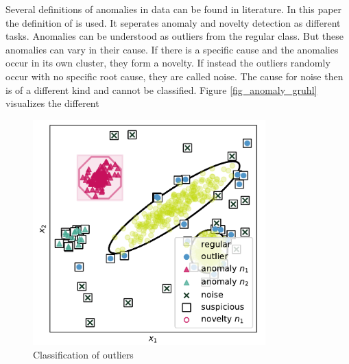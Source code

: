 Several definitions of anomalies in data can be found in literature. In this paper the definition of \cite[p. 54]{gruhl_novelty_2022} is used. It seperates anomaly and novelty detection as different tasks. Anomalies can be understood as outliers from the regular class. But these anomalies can vary in their cause. If there is a specific cause and the anomalies occur in its own cluster, they form a novelty. If instead the outliers randomly occur with no specific root cause, they are called noise. The cause for noise then is of a different kind and cannot be classified. Figure \autoref{fig_anomaly_gruhl} visualizes the different
\begin{figure}[h!] %
  \centering
  \includegraphics[width=0.8\textwidth]{images/gruhl_anomaly_definition.png}
  \caption{Classification of outliers \cite[p. 54]{gruhl_novelty_2022}}
  \label{fig_anomaly_gruhl}
\end{figure}

